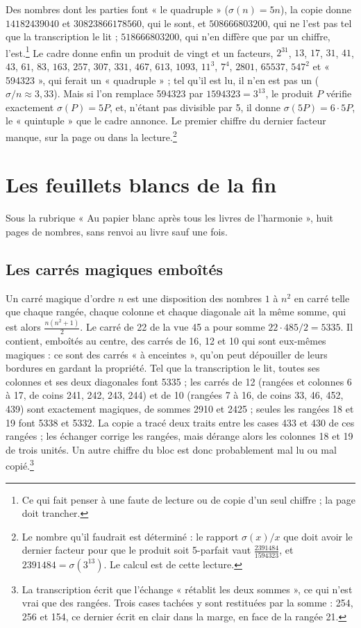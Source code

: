 \documentclass[11pt,a4paper]{article}
\begin{document}
Des nombres dont les parties font « le quadruple » ($\sigma(n) = 5n$), la copie
donne $14182439040$ et $30823866178560$, qui le sont, et $508666803200$, qui ne
l'est pas tel que la transcription le lit ; $518666803200$, qui n'en diffère que
par un chiffre, l'est.\footnote{Ce qui fait penser à une faute de lecture ou de
copie d'un seul chiffre ; la page doit trancher.} Le cadre donne enfin un produit de
vingt et un facteurs, $2^{31}$, $13$, $17$, $31$, $41$, $43$, $61$, $83$, $163$,
$257$, $307$, $331$, $467$, $613$, $1093$, $11^3$, $7^4$, $2801$, $65537$, $547^2$
et « 594323 », qui ferait un « quadruple » ; tel qu'il est lu, il n'en est pas un
($\sigma/n \approx 3{,}33$). Mais si l'on remplace 594323 par
$1594323 = 3^{13}$, le produit $P$ vérifie exactement $\sigma(P) = 5P$, et,
n'étant pas divisible par 5, il donne $\sigma(5P) = 6 \cdot 5P$, le
« quintuple » que le cadre annonce. Le premier chiffre du dernier facteur
manque, sur la page ou dans la lecture.\footnote{Le nombre qu'il faudrait est
déterminé : le rapport $\sigma(x)/x$ que doit avoir le dernier facteur pour que le
produit soit 5-parfait vaut $\frac{2391484}{1594323}$, et $2391484 =
\sigma(3^{13})$. Le calcul est de cette lecture.}

\section*{Les feuillets blancs de la fin}

Sous la rubrique « Au papier blanc après tous les livres de l'harmonie »,
huit pages de nombres, sans renvoi au livre sauf une fois.

\subsection*{Les carrés magiques emboîtés}

Un carré magique d'ordre $n$ est une disposition des nombres $1$ à $n^2$ en carré
telle que chaque rangée, chaque colonne et chaque diagonale ait la même somme,
qui est alors $\frac{n(n^2+1)}{2}$. Le carré de 22 de la vue 45 a pour somme
$22 \cdot 485 / 2 = 5335$. Il contient, emboîtés au centre, des carrés de 16, 12 et
10 qui sont eux-mêmes magiques : ce sont des carrés « à enceintes », qu'on peut
dépouiller de leurs bordures en gardant la propriété. Tel que la transcription
le lit, toutes ses colonnes et ses deux diagonales font 5335 ; les carrés de 12
(rangées et colonnes 6 à 17, de coins 241, 242, 243, 244) et de 10 (rangées 7 à
16, de coins 33, 46, 452, 439) sont exactement magiques, de sommes 2910 et 2425 ;
seules les rangées 18 et 19 font 5338 et 5332. La copie a tracé deux traits entre
les cases 433 et 430 de ces rangées ; les échanger corrige les rangées, mais
dérange alors les colonnes 18 et 19 de trois unités. Un autre chiffre du bloc est
donc probablement mal lu ou mal copié.\footnote{La transcription écrit que
l'échange « rétablit les deux sommes », ce qui n'est vrai que des rangées. Trois
cases tachées y sont restituées par la somme : 254, 256 et 154, ce dernier écrit
en clair dans la marge, en face de la rangée 21.}
\end{document}
